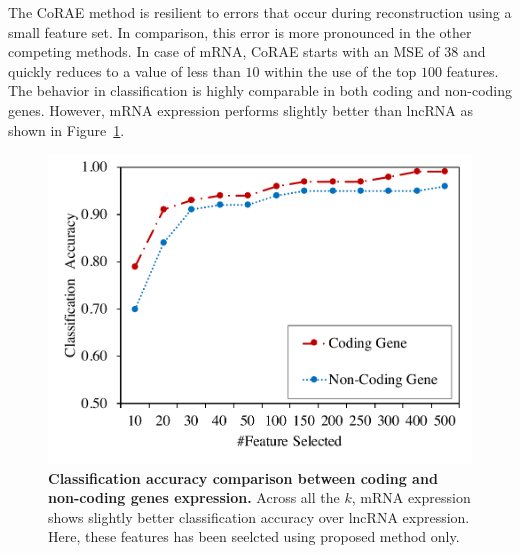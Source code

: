 \documentclass{bioinfo}
\begin{document}
The CoRAE method is resilient to errors that occur during reconstruction using a small feature set. In comparison, this error is more pronounced in the other competing methods.
In case of mRNA, CoRAE starts with an MSE of $38$ and quickly reduces to a value of less than $10$ within the use of the top $100$ features. 
The behavior in classification is highly comparable in both coding and non-coding genes.
However, mRNA expression performs slightly better than lncRNA as shown in Figure~\ref{fig:acc-mRNA-lncRNA}.
  \begin{figure}[hbt]
    \centering
    \includegraphics[scale=0.45]{fig/acc-mRNA-lncRNA.pdf}
    \caption{\textbf{Classification accuracy comparison between coding and non-coding genes expression.} Across all the $k$, mRNA expression shows slightly better classification accuracy over lncRNA expression. Here, these features has been seelcted using proposed method only.}
    \label{fig:acc-mRNA-lncRNA}
\end{figure}
\end{document}
